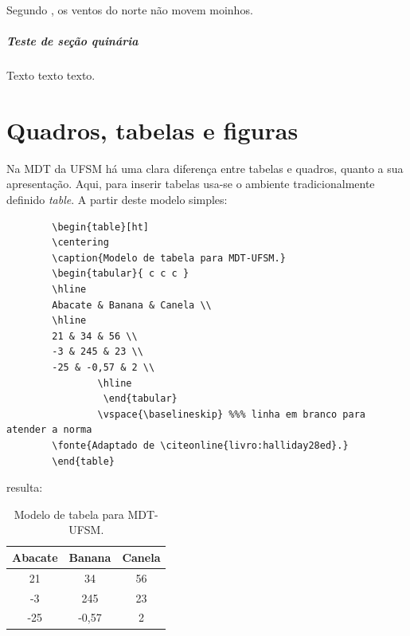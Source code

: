 \documentclass[oneside,openright,12pt]{ufsm_2015} %
\begin{document}
            Segundo , os ventos do norte não movem moinhos.

       \paragraph{Teste de seção quinária}
       
       
       \par Texto texto texto.
       
       
         \chapter{Quadros, tabelas e figuras}
         
         \par Na MDT da UFSM há uma clara diferença entre tabelas e quadros, quanto a sua apresentação. Aqui, para inserir tabelas usa-se o ambiente tradicionalmente definido \textit{table}. A partir deste modelo simples:
         

        
        
         \begin{verbatim}
		\begin{table}[ht]
		\centering
		\caption{Modelo de tabela para MDT-UFSM.}
		\begin{tabular}{ c c c }
		\hline
		Abacate & Banana & Canela \\
		\hline
		21 & 34 & 56 \\
		-3 & 245 & 23 \\
		-25 & -0,57 & 2 \\
                \hline
                 \end{tabular}
                \vspace{\baselineskip} %%% linha em branco para atender a norma
		\fonte{Adaptado de \citeonline{livro:halliday28ed}.}
		\end{table}
	  \end{verbatim}
         
         \noindent resulta:
         
         \begin{table}[ht]
         \centering
         \caption{Modelo de tabela para MDT-UFSM.}
         \begin{tabular}{ c c c }
         \hline
         Abacate & Banana & Canela \\
         \hline
         21 & 34 & 56 \\
         -3 & 245 & 23 \\
         -25 & -0,57 & 2 \\
         \hline
         \end{tabular}
         \vspace{\baselineskip} %
         \end{table}
         
\end{document}
